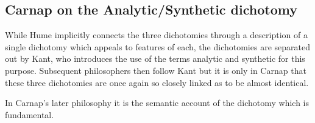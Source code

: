 \subsection{Carnap on the Analytic/Synthetic dichotomy}

While Hume implicitly connects the three dichotomies through a
description of a single dichotomy which appeals to features of each,
the dichotomies are separated out by Kant, who introduces the
use of the terms analytic and synthetic for this purpose.
Subsequent philosophers then follow Kant but it is only in Carnap that
these three dichotomies are once again so closely linked as to be
almost identical.

In Carnap's later philosophy it is the semantic account of the
dichotomy which is fundamental.



